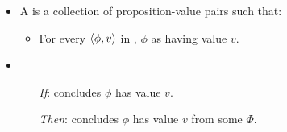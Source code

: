\begin{note}

  \begin{definition}[\pool{3}]
    \label{def:pools}

    \begin{itemize}
    \item
      A \emph{\pool{}} is a collection of proposition-value pairs such that:
      \begin{itemize}
      \item
        For every \(\langle \phi, v \rangle\) in \pool{}, \vAgent{}  \(\phi\) as having value \(v\).
      \end{itemize}
    \end{itemize}
    \vspace{-\baselineskip}
  \end{definition}

  \begin{assumption}
    \label{assu:concluding:pools}

    \begin{itemize}[noitemsep]
    \item
      \begin{enumerate}
      \item[\emph{If}:]
        \vAgent{} concludes \(\phi\) has value \(v\).
      \item[\emph{Then}:]
        \vAgent{} concludes \(\phi\) has value \(v\) from some \pool{} \(\Phi\).
      \end{enumerate}
    \end{itemize}
    \vspace{-\baselineskip}
  \end{assumption}


\end{note}
